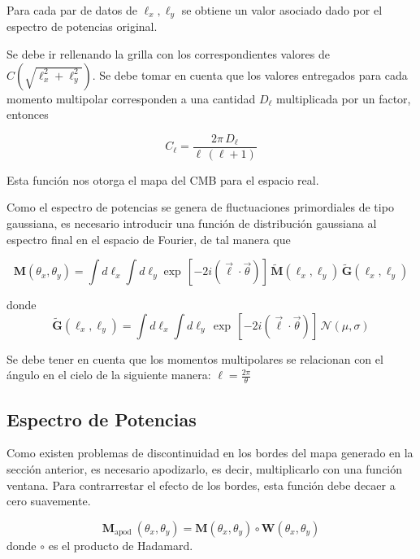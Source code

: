 \documentclass[twocolumn,letterpaper,spanish]{revtex4}
\numberwithin{equation}{section}
\begin{document}
Para cada par de datos de $\ell_x, \ell_y$ se obtiene un valor asociado dado por el espectro de potencias original.

Se debe ir rellenando la grilla con los correspondientes valores de $C(\sqrt{\ell_x^2 + \ell_y^2})$. Se debe tomar en cuenta que los valores entregados para cada momento multipolar corresponden a una cantidad $D_{\ell}$ multiplicada por un factor, entonces

\begin{equation}
C_{\ell} = \frac{2\pi\,D_{\ell}}{\ell\,(\ell+1)}
\end{equation}

Esta funci\'on nos otorga el mapa del CMB para el espacio real.

Como el espectro de potencias se genera de fluctuaciones primordiales de tipo gaussiana, es necesario introducir una funci\'on de distribuci\'on gaussiana al espectro final en el espacio de Fourier, de tal manera que

\begin{equation}
\mathbf{M}\left(\theta_{x}, \theta_{y}\right)=\int d \ell_{x} \int d \ell_{y} \exp \,[-2 i(\vec{\ell} \cdot \vec{\theta})] \,\tilde{\mathbf{M}}\left(\ell_{x}, \ell_{y}\right)\, \tilde{\mathbf{G}}\left(\ell_{x}, \ell_{y}\right)
\end{equation}

donde 
\begin{equation}
\tilde{\mathbf{G}}\left(\ell_{x}, \ell_{y}\right)=\int d \ell_{x} \int d \ell_{y} \,\exp\, [-2 i(\vec{\ell} \cdot \vec{\theta})] \,\mathcal{N}(\mu, \sigma)
\end{equation}

Se debe tener en cuenta que los momentos multipolares se relacionan con el \'angulo en el cielo de la siguiente manera: $\ell=\frac{2\pi}{\theta}$

\subsection{Espectro de Potencias}\label{espectro}

Como existen problemas de discontinuidad en los bordes del mapa generado en la secci\'on anterior, es necesario apodizarlo, es decir, multiplicarlo con una funci\'on ventana. Para contrarrestar el efecto de los bordes, esta funci\'on debe decaer a cero suavemente. 

\begin{equation}
\mathbf{M}_{\text {apod }}\left(\theta_{x}, \theta_{y}\right)=\mathbf{M}\left(\theta_{x}, \theta_{y}\right) \circ \mathbf{W}\left(\theta_{x}, \theta_{y}\right)
\end{equation}
donde $\circ$ es el producto de Hadamard.
\end{document}
